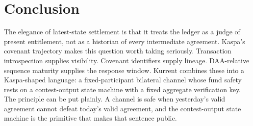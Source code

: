 \documentclass[10pt,a4paper]{article}
\begin{document}
\section{Conclusion}

The elegance of latest-state settlement is that it treats the ledger as a judge of present entitlement, not as a historian of every intermediate agreement. Kaspa's covenant trajectory makes this question worth taking seriously. Transaction introspection supplies visibility. Covenant identifiers supply lineage. DAA-relative sequence maturity supplies the response window. Kurrent combines these into a Kaspa-shaped language: a fixed-participant bilateral channel whose fund safety rests on a contest-output state machine with a fixed aggregate verification key. The principle can be put plainly. A channel is safe when yesterday's valid agreement cannot defeat today's valid agreement, and the contest-output state machine is the primitive that makes that sentence public.
\end{document}
